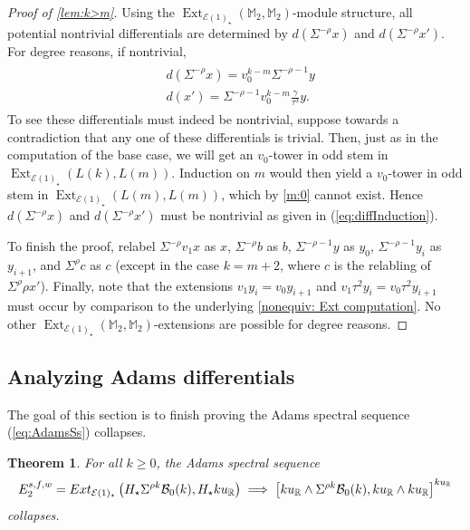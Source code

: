 \documentclass{amsart}
\newtheorem{theorem}[equation]{Theorem}
\theoremstyle{plain}
\numberwithin{equation}{section}
\numberwithin{figure}{section}
\DeclareMathOperator{\Ext}{Ext}
\newcommand{\mM}{{\mathbb M}}
\newcommand{\mR}{{\mathbb R}}
\newcommand{\cB}{{\mathcal B}}
\newcommand{\cE}{{\mathcal E}}
\newcommand{\0}{\langle 0 \rangle }
\begin{document}
\begin{proof}[Proof of \cref{lem:k>m}]
Using the $\Ext_{\cE(1)_{\star}}(\mM_{2}, \mM_{2})$-module structure, all potential nontrivial differentials are determined by $d(\Sigma^{-\rho}x)$ and $d\left(\Sigma^{-\rho}x'\right)$. For degree reasons, if nontrivial,
\begin{align} \label{eq:diffInduction}
    \begin{split}
        & d(\Sigma^{-\rho}x)  = v_{0}^{k-m}\Sigma^{-\rho - 1}y \\
        & d\left(x' \right) = \Sigma^{-\rho - 1}v_{0}^{k-m}\frac{\gamma}{\tau^3}y.
    \end{split}
\end{align} 
To see these differentials must indeed be nontrivial, suppose towards a contradiction that any one of these differentials is trivial. Then, just as in the computation of the base case, we will get an $v_{0}$-tower in odd stem in $\Ext_{\cE(1)_{\star}}(L(k), L(m))$. Induction on $m$ would then yield a $v_{0}$-tower in odd stem in $\Ext_{\cE(1)_{\star}}(L(m), L(m))$, which by \cref{m:0} cannot exist. Hence $d(\Sigma^{-\rho}x)$ and $d\left(\Sigma^{-\rho}x'\right)$ must be nontrivial as given in (\ref{eq:diffInduction}).

To finish the proof, relabel $\Sigma^{-\rho}v_{1}x$ as $x$, $\Sigma^{-\rho}b$ as $b$, $\Sigma^{-\rho - 1}y$ as $y_{0}$, $\Sigma^{-\rho - 1}y_{i}$ as $y_{i+1}$, and $\Sigma^{\rho}c$ as $c$ (except in the case $k=m+2$, where $c$ is the relabling of $\Sigma^{\rho}\rho x'$). Finally, note that the extensions $v_{1}y_{i} = v_{0}y_{i+1}$ and $v_{1}\tau^{2}y_{i} = v_{0}\tau^{2}y_{i+1}$ must occur by comparison to the underlying \cref{nonequiv: Ext computation}. No other $\Ext_{\cE(1)_{\star}}(\mM_{2}, \mM_{2})$-extensions are possible for degree reasons.
\end{proof}

\subsection{Analyzing Adams differentials}
The goal of this section is to finish proving the Adams spectral sequence (\ref{eq:AdamsSs}) collapses. 
\begin{theorem}\label{prop: spec seq collapse}
    For all $k \ge 0$, the Adams spectral sequence
   \begin{align*}
E_2^{s, f, w}  = Ext_{\mathcal{E}(1)_\star} \left(H_\star \Sigma^{\rho k} \cB_0(k), H_\star ku_\mR\right) 
      \implies \left[ku_\mR \wedge \Sigma^{\rho k} \cB_{0} (k), ku_\mR \wedge ku_\mR\right]^{ku_\mR}\notag
\end{align*}
collapses.
\end{theorem}
\end{document}
